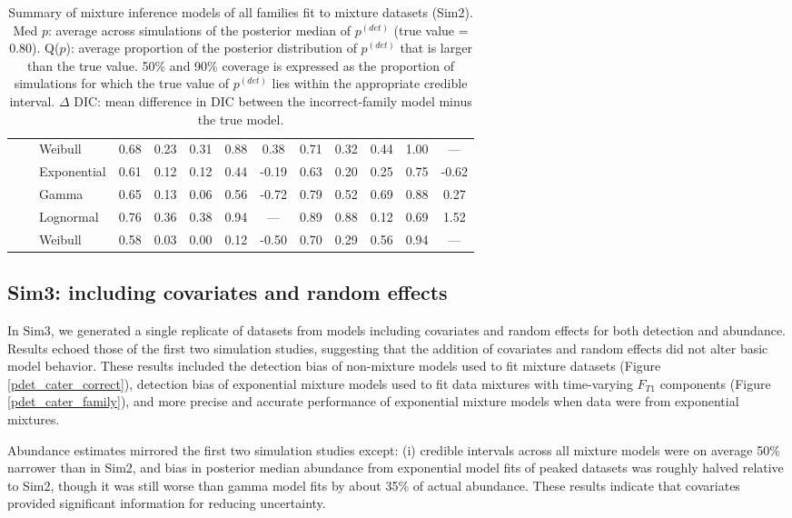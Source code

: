 \documentclass[useAMS,usenatbib,referee,12pt]{article}
\begin{document}
\begin{table}[ht]
\begin{tabular}{l|l|l|ccccc|ccccc}
& &   Weibull & 0.68 & 0.23 & 0.31 & 0.88 & 0.38 & 0.71 & 0.32 & 0.44 & 1.00 & --- \\ 
\cline{2-13}
& &   Exponential & 0.61 & 0.12 & 0.12 & 0.44 & -0.19 & 0.63 & 0.20 & 0.25 & 0.75 & -0.62 \\ 
\cline{2-13}
& \parbox[t]{2mm}{} & Gamma & 0.65 & 0.13 & 0.06 & 0.56 & -0.72 & 0.79 & 0.52 & 0.69 & 0.88 & 0.27 \\ 
& &   Lognormal & 0.76 & 0.36 & 0.38 & 0.94 & --- & 0.89 & 0.88 & 0.12 & 0.69 & 1.52 \\ 
& &   Weibull & 0.58 & 0.03 & 0.00 & 0.12 & -0.50 & 0.70 & 0.29 & 0.56 & 0.94 & --- \\ 
   \hline
\end{tabular}
\caption{\label{tbl:sim2} Summary of mixture inference models of all families fit to mixture datasets (Sim2).  
Med $p$: average across simulations of the posterior median of $p^{(det)}$ (true value = 0.80).  
Q($p$): average proportion of the posterior distribution of $p^{(det)}$ that is larger than the true value.  
50\% and 90\% coverage is expressed as the proportion of simulations for which the true value of $p^{(det)}$ lies within the appropriate credible interval.  
$\Delta$ DIC: mean difference in DIC between the incorrect-family model minus the true model.}
\end{table}



\subsection{Sim3: including covariates and random effects}\label{sec:simfull}

In Sim3, we generated a single replicate of datasets from models including covariates and random effects for both detection and abundance.  
Results echoed those of the first two simulation studies, suggesting that the addition of covariates and random effects did not alter basic model behavior.
These results included the detection bias of non-mixture models used to fit mixture datasets (Figure \ref{pdet_cater_correct}), detection bias of exponential mixture models used to fit data mixtures with time-varying $F_{T1}$ components (Figure \ref{pdet_cater_family}), and more precise and accurate performance of exponential mixture models when data were from exponential mixtures.  

Abundance estimates mirrored the first two simulation studies except: (i) credible intervals across all mixture models were on average 50\% narrower than in Sim2, and bias in posterior median abundance from exponential model fits of peaked datasets was roughly halved relative to Sim2, though it was still worse than gamma model fits by about 35\% of actual abundance.
These results indicate that covariates provided significant information for reducing uncertainty.
\end{document}
